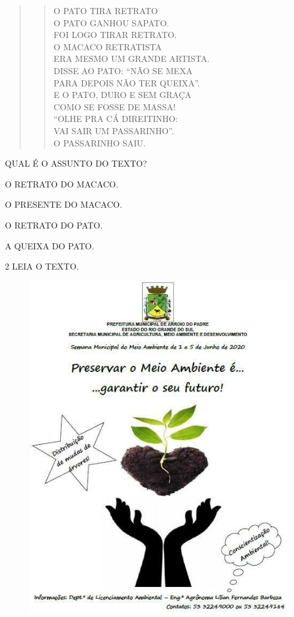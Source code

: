 \begin{quote}
\begin{verse}
O PATO TIRA RETRATO\\
O PATO GANHOU SAPATO.\\
FOI LOGO TIRAR RETRATO.\\
O MACACO RETRATISTA\\
ERA MESMO UM GRANDE ARTISTA.\\
DISSE AO PATO: “NÃO SE MEXA\\
PARA DEPOIS NÃO TER QUEIXA”.\\
E O PATO, DURO E SEM GRAÇA\\
COMO SE FOSSE DE MASSA!\\
“OLHE PRA CÁ DIREITINHO:\\
VAI SAIR UM PASSARINHO”.\\
O PASSARINHO SAIU.
\end{verse}

\end{quote}

QUAL É O ASSUNTO DO TEXTO?

\begin{escolha}
\item O RETRATO DO MACACO.

\item O PRESENTE DO MACACO.

\item O RETRATO DO PATO.

\item A QUEIXA DO PATO.
\end{escolha}

\pagebreak
\num{2} LEIA O TEXTO.

\begin{figure}[htpb!]
\centering
\includegraphics[width=.7\textwidth]{media/image166.jpg}
\end{figure}

